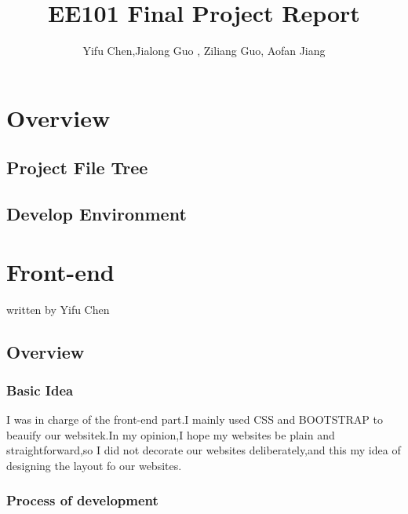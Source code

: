 \documentclass[10pt,twoside,a4paper,titlepage]{article}
\title{EE101 Final Project Report}
\author{Yifu Chen,Jialong Guo , Ziliang Guo, Aofan Jiang}
\begin{document}
\maketitle
\phantom{s}
\thispagestyle{empty}
\clearpage

\tableofcontents
\thispagestyle{empty}
\newpage
\setcounter{page}{1}

\section{Overview}
\subsection{Project File Tree}

\subsection{Develop Environment}


	\newpage
\section{Front-end}
written by Yifu Chen
	
	\subsection{Overview}
	
	\subsubsection{Basic Idea}
	
	I was in charge of the front-end part.I mainly used CSS and BOOTSTRAP to beauify our websitek.In my opinion,I hope my websites be plain and straightforward,so I did not decorate our websites deliberately,and this my idea of designing the layout fo our websites.
	
	\subsubsection{Process of development}
	
\end{document}
